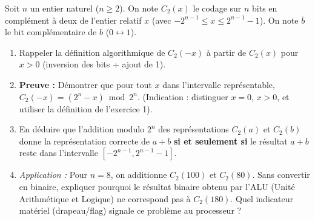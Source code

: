 \documentclass[11pt]{article}
\begin{document}
\begin{exercice}
Soit $n$ un entier naturel ($n \ge 2$). On note $C_2(x)$ le codage sur $n$ bits en complément à deux de l'entier relatif $x$ (avec $-2^{n-1} \le x \le 2^{n-1}-1$). On note $\overline{b}$ le bit complémentaire de $b$ ($0 \leftrightarrow 1$).
\begin{enumerate}
    \item Rappeler la définition algorithmique de $C_2(-x)$ à partir de $C_2(x)$ pour $x > 0$ (inversion des bits + ajout de 1).
    \item \textbf{Preuve :} Démontrer que pour tout $x$ dans l'intervalle représentable, $C_2(-x) = (2^n - x) \bmod 2^n$. (Indication : distinguer $x=0$, $x>0$, et utiliser la définition de l'exercice 1).
    \item En déduire que l'addition modulo $2^n$ des représentations $C_2(a)$ et $C_2(b)$ donne la représentation correcte de $a+b$ \textbf{si et seulement si} le résultat $a+b$ reste dans l'intervalle $[-2^{n-1}, 2^{n-1}-1]$.
    \item \textit{Application :} Pour $n=8$, on additionne $C_2(100)$ et $C_2(80)$. Sans convertir en binaire, expliquer pourquoi le résultat binaire obtenu par l'ALU (Unité Arithmétique et Logique) ne correspond pas à $C_2(180)$. Quel indicateur matériel (drapeau/flag) signale ce problème au processeur ?
\end{enumerate}
\end{exercice}
\end{document}
